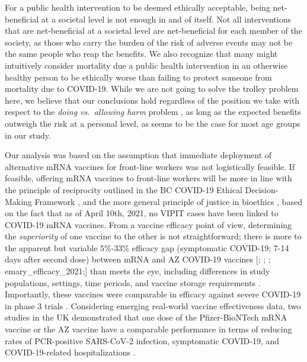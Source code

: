 \documentclass[]{interact}
\theoremstyle{plain}%
\theoremstyle{definition}
\theoremstyle{remark}
\begin{document}
For a public health intervention to be deemed ethically acceptable,
being net-beneficial at a societal level is not enough in and of itself.
Not all interventions that are net-beneficial at a societal level are
net-beneficial for each member of the society, as those who carry the
burden of the risk of adverse events may not be the same people who reap
the benefits. We also recognize that many might intuitively consider
mortality due a public health intervention in an otherwise healthy
person to be ethically worse than failing to protect someone from
mortality due to COVID-19. While we are not going to solve the trolley
problem here, we believe that our conclusions hold regardless of the
position we take with respect to the \emph{doing vs.~allowing harm}
problem \citep{woollard_doing_2016}, as long as the expected benefits
outweigh the risk at a personal level, as seems to be the case for most
age groups in our study.

Our analysis was based on the assumption that immediate deployment of
alternative mRNA vaccines for front-line workers was not logistically
feasible. If feasible, offering mRNA vaccines to front-line workers will
be more in line with the principle of reciprocity outlined in the BC
COVID-19 Ethical Decision-Making Framework \citep{bccdc_covid-19_2020},
and the more general principle of justice in bioethics
\citep{mccormick_principles_2021}, based on the fact that as of April
10th, 2021, no VIPIT cases have been linked to COVID-19 mRNA vaccines.
From a vaccine efficacy point of view, determining the
\emph{superiority} of one vaccine to the other is not straightforward;
there is more to the apparent but variable 5\%-33\% efficacy gap
(symptomatic COVID-19; 7-14 days after second dose) between mRNA and AZ
COVID-19 vaccines {[}\citet{polack_safety_2020};
\citet{baden_efficacy_2021}; \citet{astrazeneca_azd1222_2021};
emary\_efficacy\_2021;{]} than meets the eye, including differences in
study populations, settings, time periods, and vaccine storage
requirements \citep{ledford_why_2021}. Importantly, these vaccines were
comparable in efficacy against severe COVID-19 in phase 3 trials
\citep{abdool_karim_new_2021, astrazeneca_azd1222_2021}. Considering
emerging real-world vaccine effectiveness data, two studies in the UK
demonstrated that one dose of the Pfizer-BioNTech mRNA vaccine or the AZ
vaccine have a comparable performance in terms of reducing rates of
PCR-positive SARS-CoV-2 infection, symptomatic COVID-19, and
COVID-19-related hospitalizations
\citep{shrotri_vaccine_2021, jamie_lopez_bernal_early_2021}.
\end{document}
